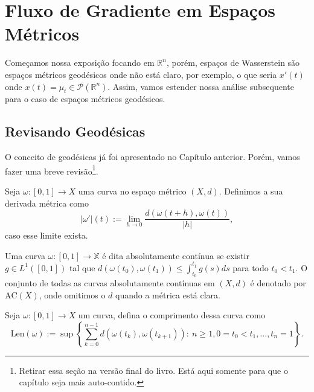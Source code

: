\section{Fluxo de Gradiente em Espaços Métricos}

Começamos nossa exposição focando em $\mathbb R^n$, porém, espaços de Wasserstein
são espaços métricos geodésicos onde não está claro, por exemplo, o que seria
$x'(t)$ onde $x(t) = \mu_t \in \mathcal P(\mathbb R^n)$.
Assim, vamos estender nossa análise subsequente para o caso de espaços métricos geodésicos.

\subsection{Revisando Geodésicas}

O conceito de geodésicas já foi apresentado no Capítulo anterior. Porém, vamos
fazer uma breve revisão\footnote{Retirar essa seção na versão final do livro. Está aqui
somente para que o capítulo seja mais auto-contido.}.

\begin{definition}
    Seja $\omega:[0,1] \to X$ uma curva no espaço métrico $(X,d)$. Definimos
    a sua derivada métrica como
    \begin{equation}
        |\omega'|(t) := \lim_{h\to 0}\frac{d(\omega(t+h),\omega(t))}{|h|},
    \end{equation}
    caso esse limite exista.
\end{definition}

\begin{definition}
    Uma curva $\omega:[0,1] \to \mathbb X$ é dita absolutamente contínua se existir
    $g \in L^1([0,1])$ tal que $d(\omega(t_0),\omega(t_1)) \leq \int^{t_1}_{t_0} g(s)ds$ para
    todo $t_0 < t_1$. O conjunto de todas as curvas absolutamente contínuas em $(X,d)$
    é denotado por $\text{AC}(X)$, onde omitimos o $d$ quando a métrica está clara.
\end{definition}

\begin{definition}[Comprimento]
    Seja $\omega:[0,1] \to X$ um curva, defina o comprimento dessa curva como
    \begin{equation}
        \text{Len}(\omega):= \sup\left\{
            \sum^{n-1}_{k=0}d(\omega(t_k),\omega(t_{k+1})): \ n\geq 1,
            0 = t_0 < t_1,...,t_n=1
        \right\}.
    \end{equation}
\end{definition}

